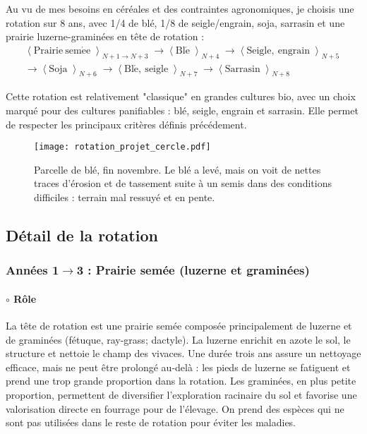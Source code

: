 \documentclass{book}
\begin{document}
Au vu de mes besoins en céréales et des contraintes agronomiques, je choisis une rotation sur 8 ans, avec 1/4 de blé, 1/8 de seigle/engrain, soja, sarrasin et une prairie luzerne-graminées en tête de rotation :
\begin{align*}
\left\langle \right. \mathrm{Prairie\ sem\acute{e}e}  \left\rangle \right._{N+1\rightarrow N+3}  \longrightarrow
\left\langle \right. \mathrm{Bl\acute{e}}  \left\rangle \right._{N+4}  
\longrightarrow
\left\langle \right. \mathrm{Seigle,\ engrain}  \left\rangle \right._{N+5} \\
\longrightarrow 
\left\langle \right.\mathrm{Soja}\left\rangle \right._{N+6}
\longrightarrow
\left\langle \right. \mathrm{Bl\acute{e},\ seigle} \left\rangle \right._{N+7}
\longrightarrow
\left\langle \right. \mathrm{Sarrasin} \left\rangle \right._{N+8}
\end{align*}

Cette rotation est relativement "classique" en grandes cultures bio, avec un choix marqué pour des cultures panifiables : blé, seigle, engrain et sarrasin. Elle permet de respecter les principaux critères définis précédement. 

\begin{figure}[h!]
\begin{center}
	\texttt{[image: rotation\_projet\_cercle.pdf]}
	\caption{Parcelle de blé, fin novembre. Le blé a levé, mais on voit de nettes traces d'érosion et de tassement suite à un semis dans des conditions difficiles : terrain mal ressuyé et en pente.}
	\label{fig:rot_cercle}
\end{center}
\end{figure}

\subsection{Détail de la rotation}
\label{part:rot_detail}

\subsubsection{Années 1$\rightarrow$3 : Prairie semée (luzerne et graminées)}

\paragraph{$\circ$ Rôle} La tête de rotation est une prairie semée composée principalement de luzerne et de graminées (fétuque, ray-grass; dactyle). La luzerne enrichit en azote le sol, le structure et nettoie le champ des vivaces. Une durée trois ans assure un nettoyage efficace, mais ne peut être prolongé au-delà : les pieds de luzerne se fatiguent et prend une trop grande proportion dans la rotation. Les graminées, en plus petite proportion, permettent de diversifier l'exploration racinaire du sol et favorise une valorisation directe en fourrage pour de l'élevage. On prend des espèces qui ne sont pas utilisées dans le reste de rotation pour éviter les maladies.
\end{document}

